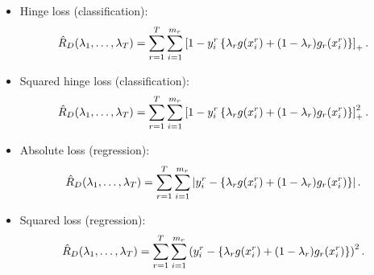 \begin{itemize}
    \item Hinge loss (classification):
    \begin{equation}
        \label{eq:hingeloss_emprisk}
        \emprisk(\lambda_1, \ldots, \lambda_\ntasks) = \sum_{r=1}^\ntasks \sum_{i=1}^{\npertask_r} \pospart{1 - y_i^r \left\lbrace\lambda_r g(x_i^r) + (1 - \lambda_r) g_r(x_i^r) \right \rbrace} .
    \end{equation}
    \item Squared hinge loss (classification):
    \begin{equation}
        \label{eq:sqhingeloss_emprisk}
        \emprisk(\lambda_1, \ldots, \lambda_\ntasks) = \sum_{r=1}^\ntasks \sum_{i=1}^{\npertask_r} \pospart{1 - y_i^r \left\lbrace\lambda_r g(x_i^r) + (1 - \lambda_r) g_r(x_i^r) \right \rbrace}^2 .
    \end{equation}
    \item Absolute loss (regression):
    \begin{equation}
        \label{eq:absloss_emprisk}
        \emprisk(\lambda_1, \ldots, \lambda_\ntasks) = \sum_{r=1}^\ntasks \sum_{i=1}^{\npertask_r} \abs{y_i^r - \left\lbrace\lambda_r g(x_i^r) + (1 - \lambda_r) g_r(x_i^r) \right \rbrace} .
    \end{equation}
    \item Squared loss (regression):
    \begin{equation}
        \label{eq:sqloss_emprisk}
        \emprisk(\lambda_1, \ldots, \lambda_\ntasks) = \sum_{r=1}^\ntasks \sum_{i=1}^{\npertask_r} \left( {y_i^r - \left\lbrace\lambda_r g(x_i^r) + (1 - \lambda_r) g_r(x_i^r) \right \rbrace} \right)^2 .
    \end{equation}
\end{itemize}
